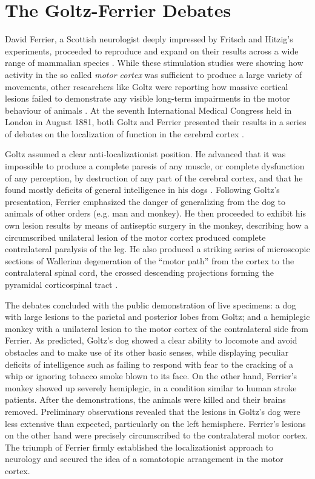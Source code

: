\section{The Goltz-Ferrier Debates}

David Ferrier, a Scottish neurologist deeply impressed by Fritsch and Hitzig's experiments, proceeded to reproduce and expand on their results across a wide range of mammalian species \cite{Ferrier1873}. While these stimulation studies were showing how activity in the so called \emph{motor cortex} was sufficient to produce a large variety of movements, other researchers like Goltz were reporting how massive cortical lesions failed to demonstrate any visible long-term impairments in the motor behaviour of animals \cite{Goltz1888}. At the seventh International Medical Congress held in London in August 1881, both Goltz and Ferrier presented their results in a series of debates on the localization of function in the cerebral cortex \cite{Tyler2000}.

Goltz assumed a clear anti-localizationist position. He advanced that it was impossible to produce a complete paresis of any muscle, or complete dysfunction of any perception, by destruction of any part of the cerebral cortex, and that he found mostly deficits of general intelligence in his dogs \cite{Tyler2000}. Following Goltz's presentation, Ferrier emphasized the danger of generalizing from the dog to animals of other orders (e.g. man and monkey). He then proceeded to exhibit his own lesion results by means of antiseptic surgery in the monkey, describing how a circumscribed unilateral lesion of the motor cortex produced complete contralateral paralysis of the leg. He also produced a striking series of microscopic sections of Wallerian degeneration \cite{Waller1850} of the ``motor path'' from the cortex to the contralateral spinal cord, the crossed descending projections forming the pyramidal corticospinal tract \cite{Tyler2000}.

The debates concluded with the public demonstration of live specimens: a dog with large lesions to the parietal and posterior lobes from Goltz; and a hemiplegic monkey with a unilateral lesion to the motor cortex of the contralateral side from Ferrier. As predicted, Goltz's dog showed a clear ability to locomote and avoid obstacles and to make use of its other basic senses, while displaying peculiar deficits of intelligence such as failing to respond with fear to the cracking of a whip or ignoring tobacco smoke blown to its face. On the other hand, Ferrier's monkey showed up severely hemiplegic, in a condition similar to human stroke patients. After the demonstrations, the animals were killed and their brains removed. Preliminary observations revealed that the lesions in Goltz's dog were less extensive than expected, particularly on the left hemisphere. Ferrier's lesions on the other hand were precisely circumscribed to the contralateral motor cortex. The triumph of Ferrier firmly established the localizationist approach to neurology and secured the idea of a somatotopic arrangement in the motor cortex.

